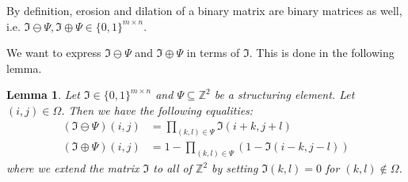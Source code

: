 \documentclass[a4paper,12pt]{article}
\theoremstyle{plain}
\newtheorem{lemma}[theorem]{Lemma}
\theoremstyle{definition}
\begin{document}
By definition, erosion and dilation of a binary matrix are binary matrices as well, i.e. $\mathfrak{I} \ominus \Psi, \mathfrak{I} \oplus \Psi \in \{ 0, 1 \}^{m \times n}$.

We want to express $\mathfrak{I} \ominus \Psi$ and $\mathfrak{I} \oplus \Psi$ in terms of $\mathfrak{I}$. This is done in the following lemma.

\begin{lemma}\label{lemerodil}
	Let $\mathfrak{I} \in \{ 0, 1 \}^{m \times n}$ and $\Psi \subseteq \mathbb{Z}^2$ be a structuring element. Let $(i, j) \in \Omega$. Then we have the following equalities:
	\begin{align}
		(\mathfrak{I} \ominus \Psi)(i, j) &= \prod_{(k, l) \in \Psi} \mathfrak{I}(i + k, j + l) \label{eqero} \\
		(\mathfrak{I} \oplus \Psi)(i, j) &= 1 - \prod_{(k, l) \in \Psi} ( 1 - \mathfrak{I}(i - k, j - l) ) \label{eqdil}
	\end{align}
	where we extend the matrix $\mathfrak{I}$ to all of $\mathbb{Z}^2$ by setting $\mathfrak{I}(k, l) = 0$ for $(k, l) \notin \Omega$.
\end{lemma}
\end{document}
